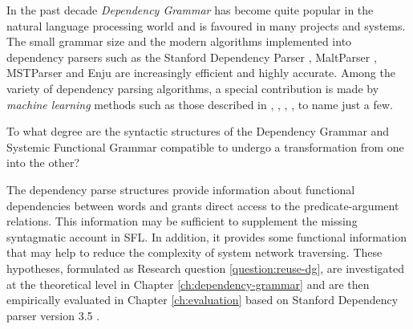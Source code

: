     
    In the past decade \textit{Dependency Grammar} \citep{Tesniere2015} has become quite popular in the natural language processing world and is favoured in many projects and systems. The small grammar size and the modern algorithms implemented into dependency parsers such as the Stanford Dependency Parser \citep{Marneffe2006}, MaltParser \citep{Nivre2006}, MSTParser \citep{McDonald2006} and Enju \citep{Miyao2005} are increasingly efficient and highly accurate. Among the variety of dependency parsing algorithms, a special contribution is made by  \textit{machine learning} methods such as those described in \citet{mcdonald2005online}, \citet{mcdonald2006online}, \citet{carreras2007experiments}, \citet{zhang2011transition}, \citet{pei2015effective} to name just a few. 
    
    \begin{question}\label{question:reuse-dg}
        To what degree are the syntactic structures of the Dependency Grammar and Systemic Functional Grammar compatible to undergo a transformation from one into the other?
    \end{question}

    The dependency parse structures provide information about functional dependencies between words and grants direct access to the predicate-argument relations. %
    This information may be sufficient to supplement the missing syntagmatic account in SFL. In addition, it provides some functional information that may help to reduce the complexity of system network traversing. 
    These hypotheses, formulated as Research question \ref{question:reuse-dg}, are investigated at the theoretical level in Chapter \ref{ch:dependency-grammar} and are then empirically evaluated in Chapter \ref{ch:evaluation} based on Stanford Dependency parser version 3.5 \citep{Marneffe2008a,Marneffe2008, Marneffe2014}.  
    
    
